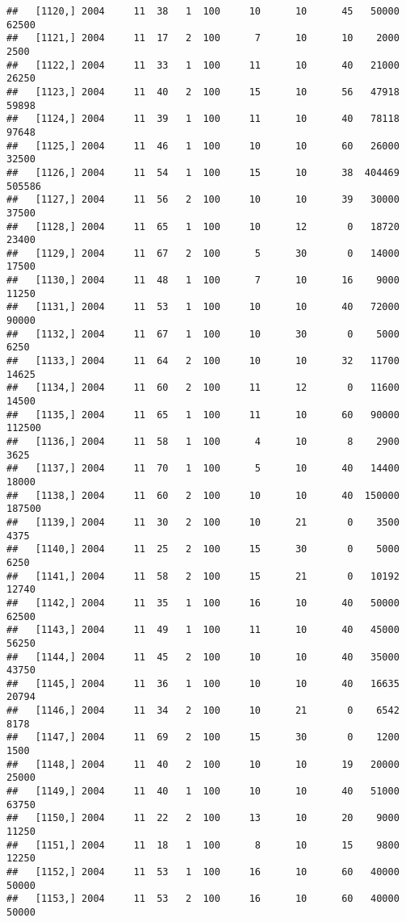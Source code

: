 \documentclass{article}\usepackage[]{graphicx}\usepackage[]{color}
\makeatletter
\newenvironment{kframe}{%
 \def\at@end@of@kframe{}%
 \ifinner\ifhmode%
  \def\at@end@of@kframe{\end{minipage}}%
  \begin{minipage}{\columnwidth}%
 \fi\fi%
 \def\FrameCommand##1{\hskip\@totalleftmargin \hskip-\fboxsep
 \colorbox{shadecolor}{##1}\hskip-\fboxsep
     \hskip-\linewidth \hskip-\@totalleftmargin \hskip\columnwidth}%
 \MakeFramed {\advance\hsize-\width
   \@totalleftmargin\z@ \linewidth\hsize
   \@setminipage}}%
 {\par\unskip\endMakeFramed%
 \at@end@of@kframe}
\newenvironment{knitrout}{}{} %
\makeatother
\begin{document}
\begin{knitrout}
\begin{kframe}
\begin{verbatim}
##   [1120,] 2004     11  38   1  100     10      10      45   50000   62500
##   [1121,] 2004     11  17   2  100      7      10      10    2000    2500
##   [1122,] 2004     11  33   1  100     11      10      40   21000   26250
##   [1123,] 2004     11  40   2  100     15      10      56   47918   59898
##   [1124,] 2004     11  39   1  100     11      10      40   78118   97648
##   [1125,] 2004     11  46   1  100     10      10      60   26000   32500
##   [1126,] 2004     11  54   1  100     15      10      38  404469  505586
##   [1127,] 2004     11  56   2  100     10      10      39   30000   37500
##   [1128,] 2004     11  65   1  100     10      12       0   18720   23400
##   [1129,] 2004     11  67   2  100      5      30       0   14000   17500
##   [1130,] 2004     11  48   1  100      7      10      16    9000   11250
##   [1131,] 2004     11  53   1  100     10      10      40   72000   90000
##   [1132,] 2004     11  67   1  100     10      30       0    5000    6250
##   [1133,] 2004     11  64   2  100     10      10      32   11700   14625
##   [1134,] 2004     11  60   2  100     11      12       0   11600   14500
##   [1135,] 2004     11  65   1  100     11      10      60   90000  112500
##   [1136,] 2004     11  58   1  100      4      10       8    2900    3625
##   [1137,] 2004     11  70   1  100      5      10      40   14400   18000
##   [1138,] 2004     11  60   2  100     10      10      40  150000  187500
##   [1139,] 2004     11  30   2  100     10      21       0    3500    4375
##   [1140,] 2004     11  25   2  100     15      30       0    5000    6250
##   [1141,] 2004     11  58   2  100     15      21       0   10192   12740
##   [1142,] 2004     11  35   1  100     16      10      40   50000   62500
##   [1143,] 2004     11  49   1  100     11      10      40   45000   56250
##   [1144,] 2004     11  45   2  100     10      10      40   35000   43750
##   [1145,] 2004     11  36   1  100     10      10      40   16635   20794
##   [1146,] 2004     11  34   2  100     10      21       0    6542    8178
##   [1147,] 2004     11  69   2  100     15      30       0    1200    1500
##   [1148,] 2004     11  40   2  100     10      10      19   20000   25000
##   [1149,] 2004     11  40   1  100     10      10      40   51000   63750
##   [1150,] 2004     11  22   2  100     13      10      20    9000   11250
##   [1151,] 2004     11  18   1  100      8      10      15    9800   12250
##   [1152,] 2004     11  53   1  100     16      10      60   40000   50000
##   [1153,] 2004     11  53   2  100     16      10      60   40000   50000

\end{verbatim}
\end{kframe}
\end{knitrout}
\end{document}
